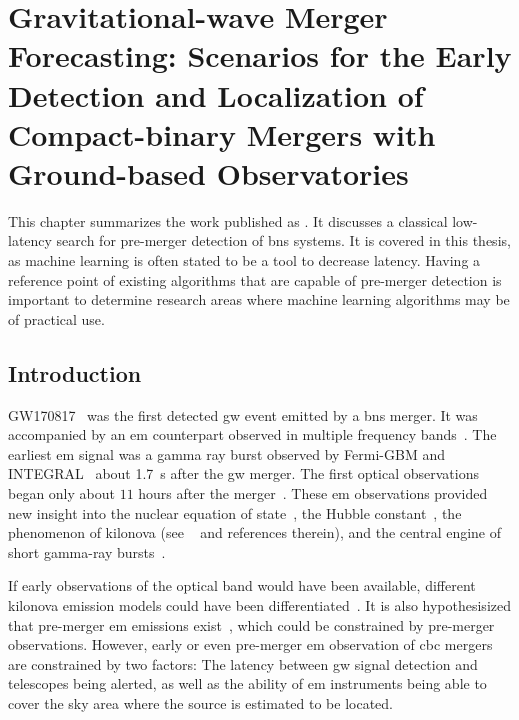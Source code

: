 \chapter{Gravitational-wave Merger Forecasting: Scenarios for the Early Detection and Localization of Compact-binary Mergers with Ground-based Observatories}\label{ch:forecasting}
This chapter summarizes the work published as \cite{Nitz:2020vym}. It discusses a classical low-latency search for pre-merger detection of \acrshort{bns} systems. It is covered in this thesis, as machine learning is often stated to be a tool to decrease latency. Having a reference point of existing algorithms that are capable of pre-merger detection is important to determine research areas where machine learning algorithms may be of practical use.

\section{Introduction}
GW170817~\cite{LIGOScientific:2017vwq} was the first detected \acrshort{gw} event emitted by a \acrshort{bns} merger. It was accompanied by an \acrshort{em} counterpart observed in multiple frequency bands~\cite{LIGOScientific:2017ync}. The earliest \acrshort{em} signal was a gamma ray burst observed by Fermi-GBM and INTEGRAL~\cite{Goldstein:2017mmi, Savchenko:2017ffs, Monitor:2017mdv} about \SI{1.7}{\second} after the \acrshort{gw} merger. The first optical observations began only about $11$ hours after the merger~\cite{Coulter:2017wya}. These \acrshort{em} observations provided new insight into the nuclear equation of state~\cite{LIGOScientific:2018hze, LIGOScientific:2018cki, Radice:2017lry, Kiuchi:2019lls, Capano:2019eae, LIGOScientific:2019eut}, the Hubble constant~\cite{Guidorzi:2017ogy, Hotokezaka:2018dfi, LIGOScientific:2018gmd}, the phenomenon of kilonova (see ~\cite{Metzger:2019zeh} and references therein), and the central engine of short gamma-ray bursts~\cite{Murguia-Berthier:2020tfs, Wu:2019rla, Lazzati:2020vbo, Nitz:2020vym}.

If early observations of the optical band would have been available, different kilonova emission models could have been differentiated~\cite{Arcavi:2018mzm}. It is also hypothesisized that pre-merger \acrshort{em} emissions exist~\cite{Hansen:2000am, Troja:2010zm, Tsang:2011ad, Metzger:2016mqu, Wang:2016dgs, Wada:2020kha}, which could be constrained by pre-merger observations. However, early or even pre-merger \acrshort{em} observation of \acrshort{cbc} mergers are constrained by two factors: The latency between \acrshort{gw} signal detection and telescopes being alerted, as well as the ability of \acrshort{em} instruments being able to cover the sky area where the source is estimated to be located.

